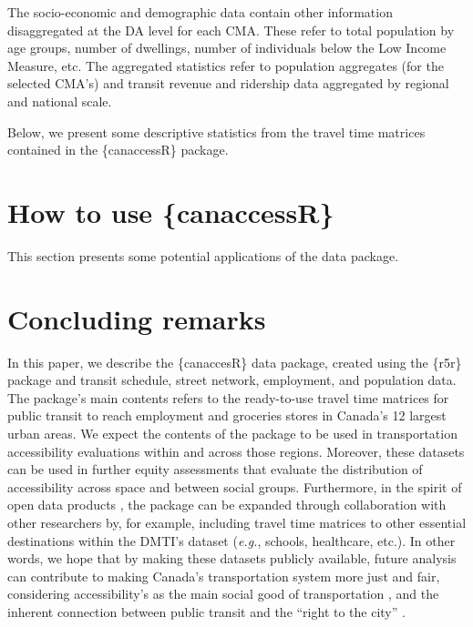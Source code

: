 \documentclass[Royal,times,sageh]{sagej}
\begin{document}
The socio-economic and demographic data contain other information
disaggregated at the DA level for each CMA. These refer to total
population by age groups, number of dwellings, number of individuals
below the Low Income Measure, etc. The aggregated statistics refer to
population aggregates (for the selected CMA's) and transit revenue and
ridership data aggregated by regional and national scale.

Below, we present some descriptive statistics from the travel time
matrices contained in the \{canaccessR\} package.

\section{How to use \{canaccessR\}}\label{how-to-use-canaccessr}

This section presents some potential applications of the data package.

\section{Concluding remarks}\label{concluding-remarks}

In this paper, we describe the \{canaccesR\} data package, created using
the \{r5r\} package and transit schedule, street network, employment,
and population data. The package's main contents refers to the
ready-to-use travel time matrices for public transit to reach employment
and groceries stores in Canada's 12 largest urban areas. We expect the
contents of the package to be used in transportation accessibility
evaluations within and across those regions. Moreover, these datasets
can be used in further equity assessments that evaluate the distribution
of accessibility across space and between social groups. Furthermore, in
the spirit of open data products
\citep{arribas-belOpenDataProductsA2021}, the package can be expanded
through collaboration with other researchers by, for example, including
travel time matrices to other essential destinations within the DMTI's
dataset (\emph{e.g.}, schools, healthcare, etc.). In other words, we
hope that by making these datasets publicly available, future analysis
can contribute to making Canada's transportation system more just and
fair, considering accessibility's as the main social good of
transportation \citep{martensTransportJusticeDesigning2016}, and the
inherent connection between public transit and the ``right to the city''
\citep{cogginRightTransportMoving2015}.
\end{document}
